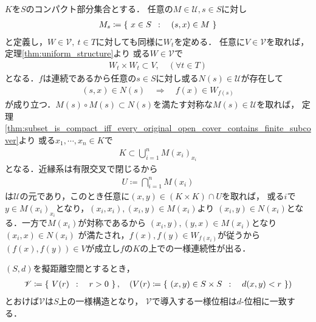 	\begin{prf}
		$K$を$S$のコンパクト部分集合とする．
		任意の$M \in \mathscr{U}, s \in S$に対し
		\begin{align}
			M_s \coloneqq \left\{\ x \in S\ \, : \quad (s,x) \in M\ \right\}
		\end{align}
		と定義し，$W \in \mathscr{V},\ t \in T$に対しても同様に$W_t$を定める．
		任意に$V \in \mathscr{V}$を取れば，定理\ref{thm:uniform_structure}より
		或る$W \in \mathscr{V}$で
		\begin{align}
			W_t \times W_t \subset V,
			\quad (\forall t \in T)
		\end{align}
		となる．$f$は連続であるから任意の$s \in S$に対し或る$N(s) \in \mathscr{U}$が存在して
		\begin{align}
			(s,x) \in N(s) \quad \Longrightarrow \quad
			f(x) \in W_{f(s)}
		\end{align}
		が成り立つ．$M(s) \circ M(s) \subset N(s)$を満たす対称な$M(s) \in \mathscr{U}$を取れば，
		定理\ref{thm:subset_is_compact_iff_every_original_open_cover_contains_finite_subcover}より
		或る$x_1,\cdots,x_n \in K$で
		\begin{align}
			K \subset \bigcup_{i=1}^n M(x_i)_{x_i}
		\end{align}
		となる．近縁系は有限交叉で閉じるから
		\begin{align}
			U \coloneqq \bigcap_{i=1}^n M(x_i)
		\end{align}
		は$\mathscr{U}$の元であり，このとき任意に$(x,y) \in (K \times K) \cap U$を取れば，
		或る$i$で$y \in M(x_i)_{x_i}$となり，$(x_i,x_i),(x_i,y) \in M(x_i)$より
		$(x_i,y) \in N(x_i)$となる．一方で$M(x_i)$が対称であるから
		$(x_i,y),(y,x) \in M(x_i)$となり$(x_i,x) \in N(x_i)$
		が満たされ，$f(x),f(y) \in W_{f(x_i)}$が従うから
		$(f(x),f(y)) \in V$が成立し$f$の$K$の上での一様連続性が出る．
		\QED
	\end{prf}
	
	\begin{screen}
		\begin{thm}[擬距離空間の一様構造]
		\label{thm:uniform_structure_on_pseudometric_spaces}
			$(S,d)$を擬距離空間とするとき，
			\begin{align}
				\mathscr{V} \coloneqq
				\left\{\ V(r)\ \, : \quad r > 0\ \right\},
				\quad (V(r) \coloneqq \left\{\ (x,y) \in S \times S\ \, : \quad d(x,y) < r\ \right\})
			\end{align}
			とおけば$\mathscr{V}$は$S$上の一様構造となり，
			$\mathscr{V}$で導入する一様位相は$d$-位相に一致する．
		\end{thm}
	\end{screen}
	
